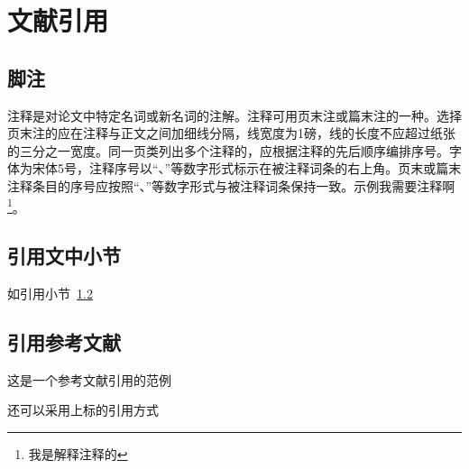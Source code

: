 
\chapter{文献引用}

\section{脚注}
注释是对论文中特定名词或新名词的注解。注释可用页末注或篇末注的一种。选择页末注的应在注释与正文之间加细线分隔，线宽度为1磅，线的长度不应超过纸张的三分之一宽度。同一页类列出多个注释的，应根据注释的先后顺序编排序号。字体为宋体5号，注释序号以“、”等数字形式标示在被注释词条的右上角。页末或篇末注释条目的序号应按照“、”等数字形式与被注释词条保持一致。示例我需要注释啊\footnote{我是解释注释的}。

\section{引用文中小节}\label{sec:ref}
如引用小节~\ref{sec:ref}

\section{引用参考文献}
这是一个参考文献引用的范例\cite{kuhn2004man}

还可以采用上标的引用方式